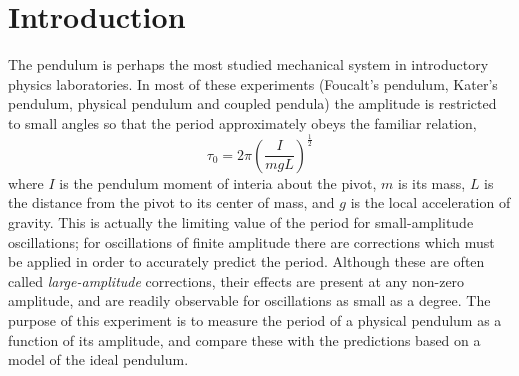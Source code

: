 \documentclass{revtex4}
\begin{document}
%
%
%
%

\section{Introduction}

The pendulum is perhaps the most studied mechanical system in
introductory physics laboratories. In most of these
experiments (Foucalt's pendulum, Kater's pendulum, physical
pendulum and coupled pendula) the amplitude is restricted to
small angles so that the period approximately obeys the familiar relation,
\begin{equation}
\tau_0 = 2\pi\left(\frac{I}{mgL}\right)^{\frac{1}{2}}
\label{eq:omega0}
\end{equation}
where $I$ is the pendulum moment of interia about the pivot, $m$ is its
mass, $L$ is the distance from the pivot to its center of mass, and $g$ is
the local acceleration of gravity.  This is actually the limiting value
of the period for small-amplitude oscillations; for oscillations of finite
amplitude there are corrections which must be applied in order to accurately
predict the period.  Although these are often called {\em large-amplitude}
corrections, their effects are present at any non-zero amplitude, and are
readily observable for oscillations as small as a degree.  The purpose of
this experiment is to measure the period of a physical pendulum as a
function of its amplitude, and compare these with the predictions based
on a model of the ideal pendulum.
\end{document}
